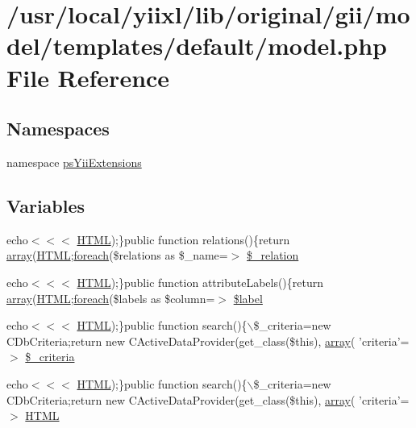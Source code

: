 \hypertarget{gii_2model_2templates_2default_2model_8php}{
\section{/usr/local/yiixl/lib/original/gii/model/templates/default/model.php File Reference}
\label{gii_2model_2templates_2default_2model_8php}
}
\subsection*{Namespaces}
\begin{DoxyCompactItemize}
\item 
namespace \hyperlink{namespacepsYiiExtensions}{psYiiExtensions}
\end{DoxyCompactItemize}
\subsection*{Variables}
\begin{DoxyCompactItemize}
\item 
echo$<$$<$$<$ \hyperlink{module_8php_a2c8135527015cd4586959ac7c2ffec92}{HTML});\}public function relations()\{return \hyperlink{list_8php_aa3205d038c7f8feb5c9f01ac4dfadc88}{array}(\hyperlink{module_8php_a2c8135527015cd4586959ac7c2ffec92}{HTML};\hyperlink{example_2scripts_2check_8php_ac6aafbc4d90cd74f481282f505f6c628}{foreach}(\$relations as \$\_\-name=$>$ \hyperlink{gii_2model_2templates_2default_2model_8php_aaf1b455f91b5583cb37930979eedc6d5}{\$\_\-relation}
\item 
echo$<$$<$$<$ \hyperlink{module_8php_a2c8135527015cd4586959ac7c2ffec92}{HTML});\}public function attributeLabels()\{return \hyperlink{list_8php_aa3205d038c7f8feb5c9f01ac4dfadc88}{array}(\hyperlink{module_8php_a2c8135527015cd4586959ac7c2ffec92}{HTML};\hyperlink{example_2scripts_2check_8php_ac6aafbc4d90cd74f481282f505f6c628}{foreach}(\$labels as \$column=$>$ \hyperlink{gii_2model_2templates_2default_2model_8php_a92ae3eac75e60335c146412727e9aa46}{\$label}
\item 
echo$<$$<$$<$ \hyperlink{module_8php_a2c8135527015cd4586959ac7c2ffec92}{HTML});\}public function search()\{$\backslash$\$\_\-criteria=new CDbCriteria;return new CActiveDataProvider(get\_\-class(\$this), \hyperlink{list_8php_aa3205d038c7f8feb5c9f01ac4dfadc88}{array}( 'criteria'=$>$ \hyperlink{gii_2model_2templates_2default_2model_8php_a28a116c3d6d8901fe4023b3d9bf7bf4c}{\$\_\-criteria}
\item 
echo$<$$<$$<$ \hyperlink{module_8php_a2c8135527015cd4586959ac7c2ffec92}{HTML});\}public function search()\{$\backslash$\$\_\-criteria=new CDbCriteria;return new CActiveDataProvider(get\_\-class(\$this), \hyperlink{list_8php_aa3205d038c7f8feb5c9f01ac4dfadc88}{array}( 'criteria'=$>$ \hyperlink{gii_2model_2templates_2default_2model_8php_a41b069b7c63debb335b91e1dcda99046}{HTML}
\end{DoxyCompactItemize}


